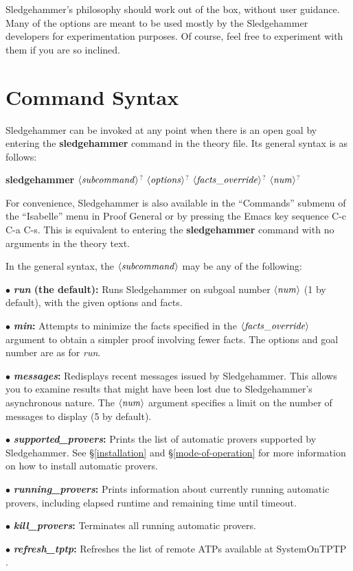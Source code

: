 \documentclass[a4paper,12pt]{article}
\def\qty#1{\ensuremath{\left<\mathit{#1\/}\right>}}
\begin{document}

Sledgehammer's philosophy should work out of the box, without user guidance.
Many of the options are meant to be used mostly by the Sledgehammer developers
for experimentation purposes. Of course, feel free to experiment with them if
you are so inclined.

\section{Command Syntax}
\label{command-syntax}

Sledgehammer can be invoked at any point when there is an open goal by entering
the \textbf{sledgehammer} command in the theory file. Its general syntax is as
follows:

\prew
\textbf{sledgehammer} \qty{subcommand}$^?$ \qty{options}$^?$ \qty{facts\_override}$^?$ \qty{num}$^?$
\postw

For convenience, Sledgehammer is also available in the ``Commands'' submenu of
the ``Isabelle'' menu in Proof General or by pressing the Emacs key sequence C-c
C-a C-s. This is equivalent to entering the \textbf{sledgehammer} command with
no arguments in the theory text.

In the general syntax, the \qty{subcommand} may be any of the following:

\begin{enum}
\item[$\bullet$] \textbf{\textit{run} (the default):} Runs Sledgehammer on
subgoal number \qty{num} (1 by default), with the given options and facts.

\item[$\bullet$] \textbf{\textit{min}:} Attempts to minimize the facts
specified in the \qty{facts\_override} argument to obtain a simpler proof
involving fewer facts. The options and goal number are as for \textit{run}.

\item[$\bullet$] \textbf{\textit{messages}:} Redisplays recent messages issued
by Sledgehammer. This allows you to examine results that might have been lost
due to Sledgehammer's asynchronous nature. The \qty{num} argument specifies a
limit on the number of messages to display (5 by default).

\item[$\bullet$] \textbf{\textit{supported\_provers}:} Prints the list of
automatic provers supported by Sledgehammer. See \S\ref{installation} and
\S\ref{mode-of-operation} for more information on how to install automatic
provers.

\item[$\bullet$] \textbf{\textit{running\_provers}:} Prints information about
currently running automatic provers, including elapsed runtime and remaining
time until timeout.

\item[$\bullet$] \textbf{\textit{kill\_provers}:} Terminates all running
automatic provers.

\item[$\bullet$] \textbf{\textit{refresh\_tptp}:} Refreshes the list of remote
ATPs available at System\-On\-TPTP \cite{sutcliffe-2000}.
\end{enum}
\end{document}
